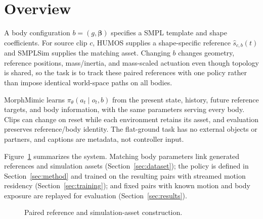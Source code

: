 \section{Overview}\label{sec:problem}
A body configuration $b=(g,\boldsymbol{\beta})$ specifies a SMPL template
and shape coefficients. For source clip $c$, HUMOS supplies a shape-specific
reference $\hat{s}_{c,b}(t)$ and SMPLSim supplies the matching asset. Changing
$b$ changes geometry, reference positions, mass/inertia, and mass-scaled
actuation even though topology is shared, so the task is to track these paired
references with one policy rather than impose identical world-space paths on
all bodies.

MorphMimic learns $\pi_\theta(a_t\mid o_t,b)$ from the present state, history,
future reference targets, and body information, with the same parameters
serving every body. Clips can change on reset while each environment retains
its asset, and evaluation preserves reference/body identity. The flat-ground
task has no external objects or partners, and captions are metadata, not
controller input.

Figure~\ref{fig:data_pipeline} summarizes the system. Matching body parameters
link generated references and simulation assets (Section~\ref{sec:dataset});
the policy is defined in Section~\ref{sec:method} and trained on the resulting
pairs with streamed motion residency (Section~\ref{sec:training}); and fixed
pairs with known motion and body exposure are replayed for evaluation
(Section~\ref{sec:results}).

\begin{figure}[t]
\centering
{}
\caption{Paired reference and simulation-asset construction.}\label{fig:data_pipeline}
\end{figure}
